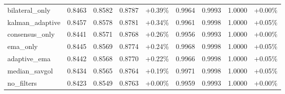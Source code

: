 \begin{table}[htbp]
\begin{adjustbox}{max width=\textwidth}
\begin{tabular}{l cccc cccc}
bilateral\_only & 0.8463 & 0.8582 & 0.8787 & +0.39\% & 0.9964 & 0.9993 & 1.0000 & +0.00\% \\
kalman\_adaptive & 0.8457 & 0.8578 & 0.8781 & +0.34\% & 0.9961 & 0.9998 & 1.0000 & +0.05\% \\
consensus\_only & 0.8441 & 0.8571 & 0.8768 & +0.26\% & 0.9956 & 0.9993 & 1.0000 & +0.00\% \\
ema\_only & 0.8445 & 0.8569 & 0.8774 & +0.24\% & 0.9968 & 0.9998 & 1.0000 & +0.05\% \\
adaptive\_ema & 0.8442 & 0.8568 & 0.8770 & +0.22\% & 0.9966 & 0.9998 & 1.0000 & +0.05\% \\
median\_savgol & 0.8434 & 0.8565 & 0.8764 & +0.19\% & 0.9971 & 0.9998 & 1.0000 & +0.05\% \\
no\_filters & 0.8423 & 0.8549 & 0.8763 & +0.00\% & 0.9959 & 0.9993 & 1.0000 & +0.00\% \\
\bottomrule
\end{tabular}
\end{adjustbox}
\end{table}